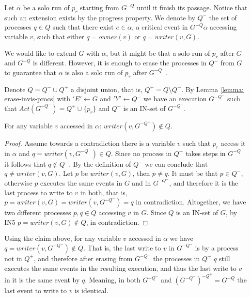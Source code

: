 Let $\alpha$ be a solo run of $p_r$ starting from $G^{-Q}$ until it finish its passage. Notice that such an extension exists by the progress property. We denote by $Q^-$ the set of processes $q \in Q$ such that there exist $e \in \alpha$, a critical event in $G^{-Q} \alpha$ accessing variable $v$, such that either $q = owner(v)$ or $q = writer(v,G)$.

We would like to extend $G$ with $\alpha$, but it might be that a solo run of $p_r$ after $G$ and $G^{-Q}$ is different. However, it is enough to erase the processes in $Q^-$ from $G$ to guarantee that $\alpha$ is also a solo run of $p_r$ after $G^{-Q^-}$.

Denote $Q = Q^- \cup Q^+$ a disjoint union, that is, $Q^+ = Q \setminus Q^-$. By Lemma \ref{lemma: erase-invis-procs} with $'E' \leftarrow G$ and $'Y' \leftarrow Q^-$ we have an execution $G^{-Q^-}$ such that $Act(G^{-Q^-}) = Q^+ \cup \{p_r\}$ and $Q^+$ is an IN-set of $G^{-Q^-}$.

\begin{claim-subsection} \label{claim: v-access-in-alpha}
	For any variable $v$ accessed in $\alpha$: $writer(v,G^{-Q^-}) \notin Q$.
\end{claim-subsection}

\begin{proof}
	Assume towards a contradiction there is a variable $v$ such that $p_r$ access it in $\alpha$ and $q = writer(v,G^{-Q^-}) \in Q$. Since no process in $Q^-$ takes steps in $G^{-Q^-}$ it follows that $q \notin Q^-$. By the definition of $Q^-$ we can conclude that $q \neq writer(v,G)$. Let $p$ be $writer(v,G)$, then $p \neq q$. It must be that $p \in Q^-$, otherwise $p$ executes the same events in $G$ and in $G^{-Q^-}$, and therefore it is the last process to write to $v$ in both, that is, $p = writer(v,G) = writer(v,G^{-Q^-}) = q$ in contradiction.
	Altogether, we have two different processes $p,q \in Q$ accessing $v$ in $G$. Since $Q$ is an IN-set of $G$, by IN5 $p = writer(v,G) \notin Q$, in contradiction.
\end{proof}

Using the claim above, for any variable $v$ accessed in $\alpha$ we have $q = writer(v,G^{-Q^-}) \notin Q$. That is, the last write to $v$ in $G^{-Q^-}$ is by a process not in $Q^+$, and therefore after erasing from $G^{-Q^-}$ the processes in $Q^+$ $q$ still executes the same events in the resulting execution, and thus the last write to $v$ in it is the same event by $q$. Meaning, in both $G^{-Q^-}$ and $(G^{-Q^-})^{-Q^+} = G^{-Q}$ the last event to write to $v$ is identical.

